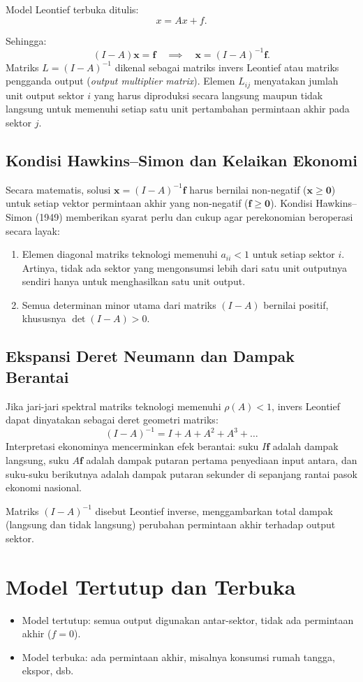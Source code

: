 \documentclass{bukumjh}
\begin{document}
Model Leontief terbuka ditulis:
\[
x = Ax + f.
\]

Sehingga:
\[
(I - A)\mathbf{x} = \mathbf{f} \quad \implies \quad \mathbf{x} = (I-A)^{-1} \mathbf{f}.
\]
Matriks $L = (I - A)^{-1}$ dikenal sebagai {\jsg matriks invers Leontief} atau matriks pengganda output (\textit{output multiplier matrix}). Elemen $L_{ij}$ menyatakan jumlah unit output sektor $i$ yang harus diproduksi secara langsung maupun tidak langsung untuk memenuhi setiap satu unit pertambahan permintaan akhir pada sektor $j$.

\subsection{Kondisi Hawkins--Simon dan Kelaikan Ekonomi}
Secara matematis, solusi $\mathbf{x} = (I - A)^{-1}\mathbf{f}$ harus bernilai non-negatif ($\mathbf{x} \ge \mathbf{0}$) untuk setiap vektor permintaan akhir yang non-negatif ($\mathbf{f} \ge \mathbf{0}$). Kondisi Hawkins--Simon (1949) memberikan syarat perlu dan cukup agar perekonomian beroperasi secara layak:
\begin{enumerate}
    \item Elemen diagonal matriks teknologi memenuhi $a_{ii} < 1$ untuk setiap sektor $i$. Artinya, tidak ada sektor yang mengonsumsi lebih dari satu unit outputnya sendiri hanya untuk menghasilkan satu unit output.
    \item Semua determinan minor utama dari matriks $(I - A)$ bernilai positif, khususnya $\det(I - A) > 0$.
\end{enumerate}

\subsection{Ekspansi Deret Neumann dan Dampak Berantai}
Jika jari-jari spektral matriks teknologi memenuhi $\rho(A) < 1$, invers Leontief dapat dinyatakan sebagai deret geometri matriks:
\[
(I - A)^{-1} = I + A + A^2 + A^3 + \dots
\]
Interpretasi ekonominya mencerminkan efek berantai: suku $I\mathbf{f}$ adalah dampak langsung, suku $A\mathbf{f}$ adalah dampak putaran pertama penyediaan input antara, dan suku-suku berikutnya adalah dampak putaran sekunder di sepanjang rantai pasok ekonomi nasional.

Matriks $(I-A)^{-1}$ disebut {\jsg Leontief inverse}, menggambarkan total dampak (langsung dan tidak langsung) perubahan permintaan akhir terhadap output sektor.

\section{Model Tertutup dan Terbuka}
\begin{itemize}
    \item {\jsg Model tertutup}: semua output digunakan antar-sektor, tidak ada permintaan akhir ($f=0$). 
    \item {\jsg Model terbuka}: ada permintaan akhir, misalnya konsumsi rumah tangga, ekspor, dsb.
\end{itemize}
\end{document}
